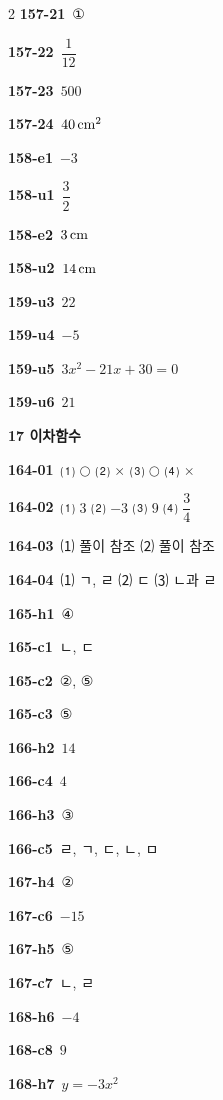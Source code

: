 \documentclass[10pt,a4paper]{article}
\begin{document}
\begin{multicols}{2}
\noindent\textbf{157-21}\ ①\par
\noindent\textbf{157-22}\ $\dfrac{1}{12}$\par
\noindent\textbf{157-23}\ $500$\par
\noindent\textbf{157-24}\ $40\mkern3mu \mathrm{cm}^2$\par
\noindent\textbf{158-e1}\ $-3$\par
\noindent\textbf{158-u1}\ $\dfrac{3}{2}$\par
\noindent\textbf{158-e2}\ $3\mkern3mu \mathrm{cm}$\par
\noindent\textbf{158-u2}\ $14\mkern3mu \mathrm{cm}$\par
\noindent\textbf{159-u3}\ $22$\par
\noindent\textbf{159-u4}\ $-5$\par
\noindent\textbf{159-u5}\ $3x^2-21x+30=0$\par
\noindent\textbf{159-u6}\ $21$\par
\noindent\textbf{17 이차함수}\par\smallskip
\noindent\textbf{164-01}\ ⑴ $\bigcirc$ ⑵ $\times$ ⑶ $\bigcirc$ ⑷ $\times$\par
\noindent\textbf{164-02}\ ⑴ $3$ ⑵ $-3$ ⑶ $9$ ⑷ $\dfrac{3}{4}$\par
\noindent\textbf{164-03}\ ⑴ 풀이 참조 ⑵ 풀이 참조\par
\noindent\textbf{164-04}\ ⑴ ㄱ, ㄹ ⑵ ㄷ ⑶ ㄴ과 ㄹ\par
\noindent\textbf{165-h1}\ ④\par
\noindent\textbf{165-c1}\ ㄴ, ㄷ\par
\noindent\textbf{165-c2}\ ②, ⑤\par
\noindent\textbf{165-c3}\ ⑤\par
\noindent\textbf{166-h2}\ $14$\par
\noindent\textbf{166-c4}\ $4$\par
\noindent\textbf{166-h3}\ ③\par
\noindent\textbf{166-c5}\ ㄹ, ㄱ, ㄷ, ㄴ, ㅁ\par
\noindent\textbf{167-h4}\ ②\par
\noindent\textbf{167-c6}\ $-15$\par
\noindent\textbf{167-h5}\ ⑤\par
\noindent\textbf{167-c7}\ ㄴ, ㄹ\par
\noindent\textbf{168-h6}\ $-4$\par
\noindent\textbf{168-c8}\ $9$\par
\noindent\textbf{168-h7}\ $y=-3x^2$\par

\end{multicols}
\end{document}
